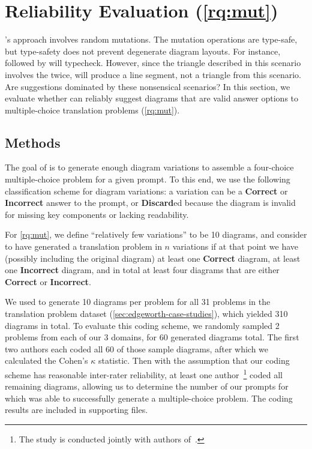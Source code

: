 \section{Reliability Evaluation (\ref{rq:mut})}
\label{sec:reliability-eval}

\Edgeworth's approach involves random mutations. The mutation operations are type-safe, but type-safety does not prevent degenerate diagram layouts. For instance,  followed by  will typecheck. However, since the triangle described in this scenario involves the  twice, \Edgeworth will produce a line segment, not a triangle from this scenario. Are \Edgeworth suggestions dominated by these nonsensical scenarios? In this section, we evaluate whether \Edgeworth can reliably suggest diagrams that are valid answer options to multiple-choice translation problems (\ref{rq:mut}). 

\subsection{Methods}
\label{sec:reliability-method}

The goal of \Edgeworth is to generate enough diagram variations to assemble a four-choice multiple-choice problem for a given prompt. To this end, we use the following classification scheme for diagram variations: a variation can be a \textbf{Correct} or \textbf{Incorrect} answer to the prompt, or \textbf{Discard}ed because the diagram is invalid for missing key components or lacking readability.

For \ref{rq:mut}, we define ``relatively few variations'' to be 10 diagrams, and consider \Edgeworth to have generated a translation problem in $n$ variations if at that point we have (possibly including the original diagram) at least one \textbf{Correct} diagram, at least one \textbf{Incorrect} diagram, and in total at least four diagrams that are either \textbf{Correct} or \textbf{Incorrect}.

We used \Edgeworth to generate 10 diagrams per problem for all 31 problems in the translation problem dataset (\cref{sec:edgeworth-case-studies}), which yielded 310 diagrams in total. To evaluate this coding scheme, we randomly sampled 2 problems from each of our 3 domains, for 60 generated diagrams total. The first two authors each coded all 60 of those sample diagrams, after which we calculated the Cohen's $\kappa$ \cite{cohen1960coefficient} statistic. Then with the assumption that our coding scheme has reasonable inter-rater reliability, at least one author~\footnote{The study is conducted jointly with authors of~\citet{ni_edgeworth_2024}.} coded all remaining diagrams, allowing us to determine the number of our prompts for which \Edgeworth was able to successfully generate a multiple-choice problem. The coding results are included in supporting files.

